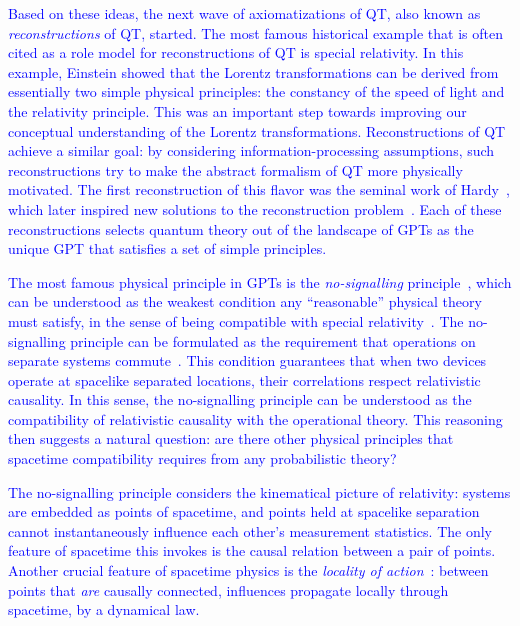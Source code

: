 \documentclass[prl,aps,reprint,twocolumn,10pt,superscriptaddress,floatfix]{revtex4-2}
\begin{document}
\textcolor{blue}{Based on these ideas, the next wave of axiomatizations of QT,
also known as \emph{reconstructions} of QT, started. The most famous
historical example that is often cited as a role model for reconstructions of
QT is special relativity. In this example, Einstein showed that the Lorentz transformations
can be derived from essentially two simple physical principles: the constancy
of the speed of light and the relativity principle. This was an important
step towards improving our conceptual understanding of the Lorentz
transformations. Reconstructions of QT achieve a similar goal: by considering
information-processing assumptions, such reconstructions try to make the
abstract formalism of QT more physically motivated. The first reconstruction
of this flavor was the seminal work of Hardy~\cite{Hardy2001}, which later
inspired new solutions to the reconstruction
problem~\cite{CDP2011, MasanesMuller2011}. Each of these reconstructions
selects quantum theory out of the landscape of GPTs as the unique GPT that
satisfies a set of simple principles.}

\textcolor{blue}{The most famous physical principle in GPTs is the
\emph{no-signalling} principle~\cite{PopescuRohrlich1994}, which can be
understood as the weakest condition any ``reasonable'' physical theory must
satisfy, in the sense of being compatible with special
relativity~\cite{Gisin2020}. The no-signalling principle can be formulated as
the requirement that operations on separate systems
commute~\cite{Barrett2007}. This condition guarantees that when two devices
operate at spacelike separated locations, their correlations respect
relativistic causality. In this sense, the no-signalling principle can be
understood as the compatibility of relativistic causality with the operational
theory. This reasoning then suggests a natural question: are there other
physical principles that spacetime compatibility requires from any
probabilistic theory?}

\textcolor{blue}{The no-signalling principle considers the kinematical
picture of relativity: systems are embedded as points of spacetime, and
points held at spacelike separation cannot instantaneously influence each
other's measurement statistics. The only feature of spacetime this invokes
is the causal relation between a pair of points. Another crucial feature of
spacetime physics is the \emph{locality of action}~\cite{Einstein1948}:
between points that \emph{are} causally connected, influences propagate
locally through spacetime, by a dynamical law.}
\end{document}
